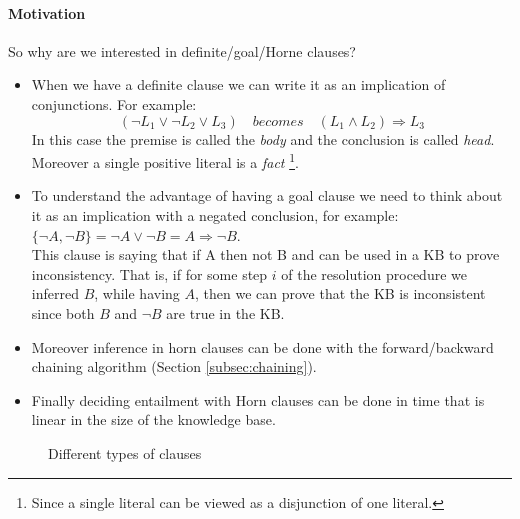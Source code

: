 \documentclass[10pt,a4paper]{article}
\newcommand{\braces}[1]{%
  \lbrace{#1}\rbrace}
\begin{document}
\paragraph{Motivation}
So why are we interested in definite/goal/Horne clauses?\\
\begin{itemize}
\item When we have a definite clause we can write it as an implication of conjunctions. For example:
\[(\neg L_1 \vee \neg L_2 \vee L_3)\quad becomes\quad (L_1 \wedge L_2)\Rightarrow L_3\]
In this case the premise is called the \textit{body} and the conclusion is called \textit{head}. Moreover a single positive literal is a \textit{fact} \footnote{Since a single literal can be viewed as a disjunction of one literal.}.
\item To understand the advantage of having a goal clause  we need to think about it as an implication with a negated conclusion, for example: $\braces{\neg A, \neg B}=\neg A \vee \neg B= A \Rightarrow \neg B$.\\
This clause is saying that if A then not B and can be used in a KB to prove inconsistency. That is, if for some step $i$ of the resolution procedure we inferred $B$, while having $A$, then we can prove that the KB is inconsistent since both $B$ and $\neg B$ are true in the KB.

\item Moreover inference in horn clauses can be done with the forward/backward chaining algorithm (Section \ref{subsec:chaining}).
\item Finally deciding entailment with Horn clauses can be done in time that is linear in the size of the knowledge base.




\end{itemize}

\begin{figure}[H]
\centering
{}
\caption{Different types of clauses}
\label{fig:clauses}
\end{figure}
\end{document}

